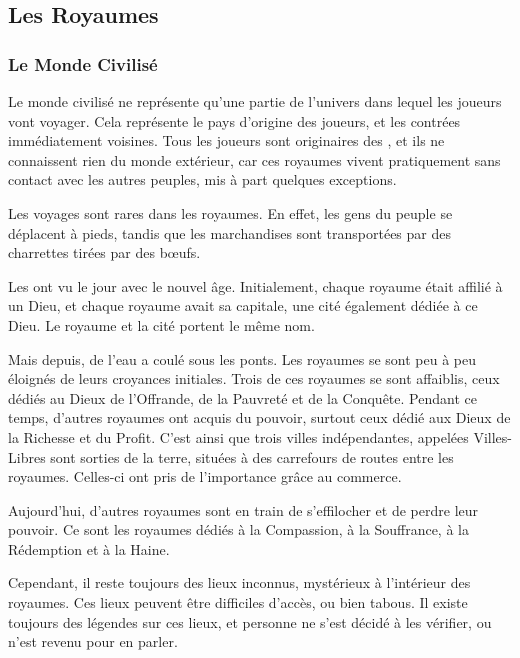 \documentclass[a4paper,10pt,openany]{book}
\begin{document}
\begin{multicols}{2}

\subsection{Les Royaumes}

\subsubsection{Le Monde Civilisé}
Le monde civilisé ne représente qu’une partie de l’univers dans lequel les joueurs vont voyager. Cela représente le pays d’origine des joueurs, et les
contrées immédiatement voisines. Tous les joueurs sont originaires des \Royaumes, et ils ne connaissent rien du monde extérieur, car ces royaumes
vivent pratiquement sans contact avec les autres peuples, mis à part quelques exceptions.\par Les voyages sont rares dans les royaumes. En effet, les
gens du peuple se déplacent à pieds, tandis que les marchandises sont transportées par des charrettes tirées par des bœufs.\par Les \Royaumes ont vu
le jour avec le nouvel âge. Initialement, chaque royaume était affilié à un Dieu, et chaque royaume avait sa capitale, une cité également dédiée à ce
Dieu. Le royaume et la cité portent le même nom.\par  Mais depuis, de l’eau a coulé sous les ponts. Les royaumes se sont peu à peu éloignés de leurs
croyances initiales. Trois de ces royaumes se sont affaiblis, ceux dédiés au Dieux de l’Offrande, de la Pauvreté et de la Conquête. Pendant ce temps,
d’autres royaumes ont acquis du pouvoir, surtout ceux dédié aux Dieux de la Richesse et du Profit. C’est ainsi que trois villes indépendantes,
appelées Villes-Libres sont sorties de la terre, situées à des carrefours de routes entre les royaumes. Celles-ci ont pris de l’importance grâce au
commerce.\par Aujourd’hui, d’autres royaumes sont en train de s’effilocher et de perdre leur pouvoir. Ce sont les royaumes dédiés à la Compassion, à
la Souffrance, à la Rédemption et à la Haine.\par Cependant, il reste toujours des lieux inconnus, mystérieux à l’intérieur des royaumes. Ces lieux
peuvent être difficiles d’accès, ou bien tabous. Il existe toujours des légendes sur ces lieux, et personne ne s’est décidé à les vérifier, ou n’est
revenu pour en parler.

\end{multicols}
\end{document}
